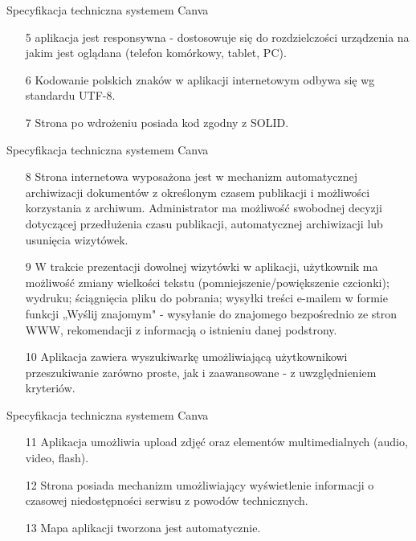 \documentclass{beamer}
\begin{document}
\begin{frame}{Specyfikacja techniczna systemem Canva}
    \begin{enumerate}
        \item[5] aplikacja jest responsywna - dostosowuje się do rozdzielczości urządzenia na jakim jest
    oglądana (telefon komórkowy, tablet, PC).
        \item[6] Kodowanie polskich znaków w aplikacji internetowym odbywa się wg standardu UTF-8.
        \item[7] Strona po wdrożeniu posiada kod zgodny z SOLID.
    \end{enumerate}
\end{frame}
\begin{frame}{Specyfikacja techniczna systemem Canva}
    \begin{enumerate}
        \item[8] Strona internetowa wyposażona jest w mechanizm automatycznej archiwizacji dokumentów
    z określonym czasem publikacji i możliwości korzystania z archiwum. Administrator ma możliwość
    swobodnej decyzji dotyczącej przedłużenia czasu publikacji, automatycznej archiwizacji lub
    usunięcia wizytówek.
        \item[9] W trakcie prezentacji dowolnej wizytówki w aplikacji, użytkownik ma możliwość zmiany wielkości
    tekstu (pomniejszenie/powiększenie czcionki); wydruku; ściągnięcia pliku do pobrania; wysyłki
    treści e-mailem w formie funkcji „Wyślij znajomym" - wysyłanie do znajomego bezpośrednio ze stron
    WWW, rekomendacji z informacją o istnieniu danej podstrony.
        \item[10] Aplikacja zawiera wyszukiwarkę umożliwiającą użytkownikowi przeszukiwanie
    zarówno proste, jak i zaawansowane - z uwzględnieniem kryteriów.
    \end{enumerate}
\end{frame}

\begin{frame}{Specyfikacja techniczna systemem Canva}
    \begin{enumerate}
        \item[11] Aplikacja umożliwia upload zdjęć oraz elementów multimedialnych (audio, video,
    flash).
        \item[12] Strona posiada mechanizm umożliwiający wyświetlenie informacji o czasowej niedostępności
    serwisu z powodów technicznych.
        \item[13] Mapa aplikacji tworzona jest automatycznie.
    \end{enumerate}
\end{frame}
\end{document}
